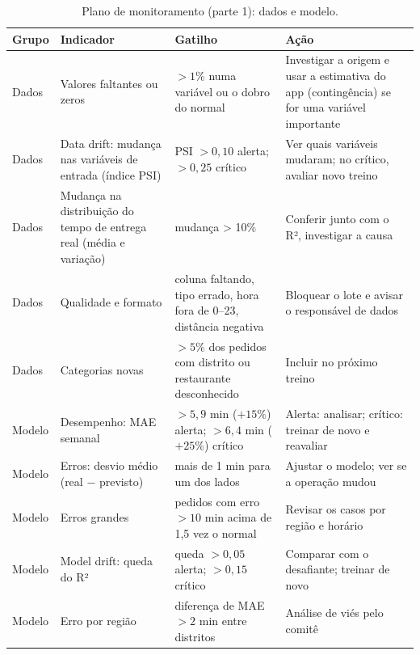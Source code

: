 \documentclass[11pt,a4paper]{article}
\begin{document}
\begin{table}[H]
\centering\footnotesize
\begin{tabularx}{\linewidth}{l >{\raggedright\arraybackslash}p{4.2cm} L L}
\toprule
Grupo & Indicador & Gatilho & Ação \\
\midrule
Dados & Valores faltantes ou zeros & $>1\%$ numa variável ou o dobro do normal & Investigar a origem e usar a estimativa do app (contingência) se for uma variável importante \\
Dados & Data drift: mudança nas variáveis de entrada (índice PSI) & PSI $>0{,}10$ alerta; $>0{,}25$ crítico & Ver quais variáveis mudaram; no crítico, avaliar novo treino \\
Dados & Mudança na distribuição do tempo de entrega real (média e variação) & mudança > 10\% & Conferir junto com o R², investigar a causa \\
Dados & Qualidade e formato & coluna faltando, tipo errado, hora fora de 0--23, distância negativa & Bloquear o lote e avisar o responsável de dados \\
Dados & Categorias novas & $>5\%$ dos pedidos com distrito ou restaurante desconhecido & Incluir no próximo treino \\
\midrule
Modelo & Desempenho: MAE semanal & $>5{,}9$ min ($+15\%$) alerta; $>6{,}4$ min ($+25\%$) crítico & Alerta: analisar; crítico: treinar de novo e reavaliar \\
Modelo & Erros: desvio médio (real $-$ previsto) & mais de 1 min para um dos lados & Ajustar o modelo; ver se a operação mudou \\
Modelo & Erros grandes & pedidos com erro $>10$ min acima de 1,5 vez o normal & Revisar os casos por região e horário \\
Modelo & Model drift: queda do R² & queda $>0{,}05$ alerta; $>0{,}15$ crítico & Comparar com o desafiante; treinar de novo \\
Modelo & Erro por região & diferença de MAE $>2$ min entre distritos & Análise de viés pelo comitê \\
\bottomrule
\end{tabularx}
\caption{Plano de monitoramento (parte 1): dados e modelo.}
\label{tab:mon}
\end{table}
\end{document}
